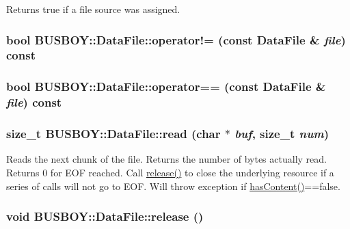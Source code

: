 Returns true if a file source was assigned. \hypertarget{classBUSBOY_1_1DataFile_a80fb802d3eeea675fb10c6980a1d957e}{
\subsubsection[{operator!=}]{\setlength{\rightskip}{0pt plus 5cm}bool BUSBOY::DataFile::operator!= (const {\bf DataFile} \& {\em file}) const}}
\label{classBUSBOY_1_1DataFile_a80fb802d3eeea675fb10c6980a1d957e}
\hypertarget{classBUSBOY_1_1DataFile_aca053deb6ed3aeff58ebca88a8bd2267}{
\subsubsection[{operator==}]{\setlength{\rightskip}{0pt plus 5cm}bool BUSBOY::DataFile::operator== (const {\bf DataFile} \& {\em file}) const}}
\label{classBUSBOY_1_1DataFile_aca053deb6ed3aeff58ebca88a8bd2267}
\hypertarget{classBUSBOY_1_1DataFile_a104c0a452496118e024a1c5f1a68753b}{
\subsubsection[{read}]{\setlength{\rightskip}{0pt plus 5cm}size\_\-t BUSBOY::DataFile::read (char $\ast$ {\em buf}, \/  size\_\-t {\em num})}}
\label{classBUSBOY_1_1DataFile_a104c0a452496118e024a1c5f1a68753b}


Reads the next chunk of the file. Returns the number of bytes actually read. Returns 0 for EOF reached. Call \hyperlink{classBUSBOY_1_1DataFile_ac8bda59f629f6b8437f51bcd4e15cae0}{release()} to close the underlying resource if a series of calls will not go to EOF. Will throw exception if \hyperlink{classBUSBOY_1_1DataFile_aa127c5ce6db57b3e35151a2c44404f0a}{hasContent()}==false. \hypertarget{classBUSBOY_1_1DataFile_ac8bda59f629f6b8437f51bcd4e15cae0}{
\subsubsection[{release}]{\setlength{\rightskip}{0pt plus 5cm}void BUSBOY::DataFile::release ()}}
\label{classBUSBOY_1_1DataFile_ac8bda59f629f6b8437f51bcd4e15cae0}


